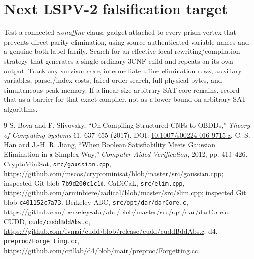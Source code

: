 \documentclass[11pt]{article}
\begin{document}
\section{Next LSPV-2 falsification target}
Test a connected \emph{nonaffine} clause gadget attached to every prism vertex that prevents direct parity elimination, using source-authenticated variable names and a genuine both-label family. Search for an effective local rewriting/compilation strategy that generates a single ordinary-3CNF child and repeats on its own output. Track any survivor core, intermediate affine elimination rows, auxiliary variables, parser/index costs, failed order search, full physical bytes, and simultaneous peak memory. If a linear-size arbitrary SAT core remains, record that as a barrier for that exact compiler, not as a lower bound on arbitrary SAT algorithms.

\begin{thebibliography}{9}
 S. Bova and F. Slivovsky, ``On Compiling Structured CNFs to OBDDs,'' \emph{Theory of Computing Systems} 61, 637--655 (2017). DOI: \href{https://doi.org/10.1007/s00224-016-9715-z}{10.1007/s00224-016-9715-z}.
 C.-S. Han and J.-H. R. Jiang, ``When Boolean Satisfiability Meets Gaussian Elimination in a Simplex Way,'' \emph{Computer Aided Verification}, 2012, pp. 410--426.
 CryptoMiniSat, \texttt{src/gaussian.cpp}, \url{https://github.com/msoos/cryptominisat/blob/master/src/gaussian.cpp}; inspected Git blob \texttt{7b9d200c1c1d}.
 CaDiCaL, \texttt{src/elim.cpp}, \url{https://github.com/arminbiere/cadical/blob/master/src/elim.cpp}; inspected Git blob \texttt{c401152c7a73}.
 Berkeley ABC, \texttt{src/opt/dar/darCore.c}, \url{https://github.com/berkeley-abc/abc/blob/master/src/opt/dar/darCore.c}.
 CUDD, \texttt{cudd/cuddBddAbs.c}, \url{https://github.com/ivmai/cudd/blob/release/cudd/cuddBddAbs.c}.
 d4, \texttt{preproc/Forgetting.cc}, \url{https://github.com/crillab/d4/blob/main/preproc/Forgetting.cc}.
\end{thebibliography}
\end{document}
